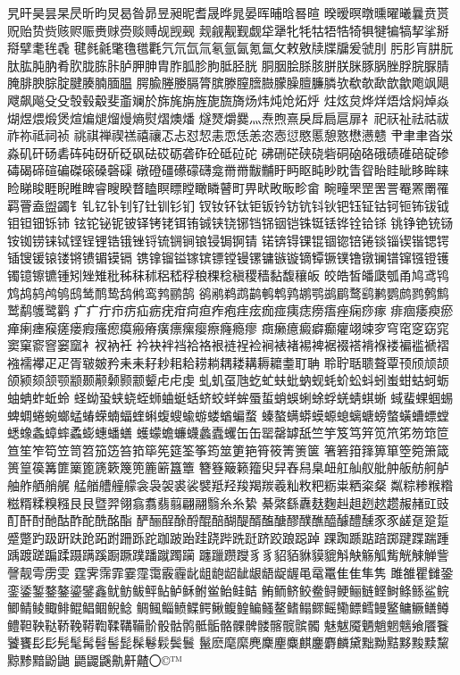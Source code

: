 旯旰昊昙杲昃昕昀炅曷昝昴昱昶昵耆晟晔晁晏晖晡晗晷暄
暌暧暝暾曛曜曦曩贲贳贶贻贽赀赅赆赈赉赇赍赕赙觇觊觋
觌觎觏觐觑牮犟牝牦牯牾牿犄犋犍犏犒挈挲掰搿擘耄毪毳
毽毵毹氅氇氆氍氕氘氙氚氡氩氤氪氲攵敕敫牍牒牖爰虢刖
肟肜肓肼朊肽肱肫肭肴肷胧胨胩胪胛胂胄胙胍胗朐胝胫胱
胴胭脍脎胲胼朕脒豚脶脞脬脘脲腈腌腓腴腙腚腱腠腩腼腽
腭腧塍媵膈膂膑滕膣膪臌朦臊膻臁膦欤欷欹歃歆歙飑飒飓
飕飙飚⽎殳彀毂觳斐齑斓於旆旄旃旌旎旒旖炀炜炖炝炻烀
炷炫炱烨烊焐焓焖焯焱煳煜煨煅煲煊煸煺熘熳熵熨熠燠燔
燧燹爝爨灬焘煦熹戾戽扃扈扉礻祀祆祉祛祜祓祚祢祗祠祯
祧祺禅禊禚禧禳忑忐怼恝恚恧恁恙恣悫愆愍慝憩憝懋懑戆
肀⾀聿沓泶淼矶矸砀砉砗砘砑斫砭砜砝砹砺砻砟砼砥砬砣
砩硎硭硖硗砦硐硇硌硪碛碓碚碇碜碡碣碲碹碥磔磙磉磬磲
礅磴礓礤礞礴龛⿋黹黻黼盱眄眍盹眇眈眚眢眙眭眦眵眸睐
睑睇睃睚睨睢睥睿瞍睽瞀瞌瞑瞟瞠瞰瞵瞽町畀畎畋畈畛畲
畹疃罘罡罟詈罨罴罱罹羁罾盍盥蠲钅钆钇钋钊钌钍钏钐钔
钗钕钚钛钜钣钤钫钪钭钬钯钰钲钴钶钷钸钹钺钼钽钿铄铈
铉铊铋铌铍铎铐铑铒铕铖铗铙铘铛铞铟铠铢铤铥铧铨铪铩
铫铮铯铳铴铵铷铹铼铽铿锃锂锆锇锉锊锍锎锏锒锓锔锕锖
锘锛锝锞锟锢锪锫锩锬锱锲锴锶锷锸锼锾锿镂锵镄镅镆镉
镌镎镏镒镓镔镖镗镘镙镛镞镟镝镡镢镤镥镦镧镨镩镪镫镬
镯镱镲镳锺矧矬雉秕秭秣秫稆嵇稃稂稞稔稹稷穑黏馥穰皈
皎皓皙皤瓞瓠甬鸠鸢鸨鸩鸪鸫鸬鸲鸱鸶鸸鸷鸹鸺鸾鹁鹂鹄
鹆鹇鹈鹉鹋鹌鹎鹑鹕鹗鹚鹛鹜鹞鹣鹦鹧鹨鹩鹪鹫鹬鹱鹭鹳
⽧疒疔疖疠疝疬疣疳疴疸痄疱疰痃痂痖痍痣痨痦痤痫痧瘃
痱痼痿瘐瘀瘅瘌瘗瘊瘥瘘瘕瘙瘛瘼瘢瘠癀瘭瘰瘿瘵癃瘾瘳
癍癞癔癜癖癫癯翊竦穸穹窀窆窈窕窦窠窬窨窭窳衤衩衲衽
衿袂袢裆袷袼裉裢裎裣裥裱褚裼裨裾裰褡褙褓褛褊褴褫褶
襁襦襻⽦疋胥皲皴矜⽾耒耔耖耜耠耢耥耦耧耩耨耱耋耵聃
聆聍聒聩聱覃顸颀颃颉颌颍颏颔颚颛颞颟颡颢颥颦⾌虍虔
虬虮虿虺虼虻蚨蚍蚋蚬蚝蚧蚣蚪蚓蚩蚶蛄蚵蛎蚰蚺蚱蚯蛉
蛏蚴蛩蛱蛲蛭蛳蛐蜓蛞蛴蛟蛘蛑蜃蜇蛸蜈蜊蜍蜉蜣蜻蜞蜥
蜮蜚蜾蝈蜴蜱蜩蜷蜿螂蜢蝽蝾蝻蝠蝰蝌蝮螋蝓蝣蝼蝤蝙蝥
螓螯螨蟒蟆螈螅螭螗螃螫蟥螬螵螳蟋蟓螽蟑蟀蟊蟛蟪蟠蟮
蠖蠓蟾蠊蠛蠡蠹蠼⽸缶罂罄罅舐竺竽笈笃笄笕笊笫笏筇笸
笪笙笮笱笠笥笤笳笾笞筘筚筅筵筌筝筠筮筻筢筲筱箐箦箧
箸箬箝箨箅箪箜箢箫箴篑篁篌篝篚篥篦篪簌篾篼簏簖簋簟
簪簦簸籁籀臾舁舂舄臬衄舡舢舣舭舯舨舫舸舻舳舴舾艄艉
艋艏艚艟艨衾袅袈裘裟襞羝羟羧羯羰羲籼敉粑粝粜粞粢粲
粼粽糁糇糌糍糈糅糗糨⾉艮暨羿翎翕翥翡翦翩翮翳⽷糸絷
綦綮繇纛麸麴赳趄趔趑趱赧赭豇豉酊酐酎酏酤酢酡酰酩酯
酽酾酲酴酹醌醅醐醍醑醢醣醪醭醮醯醵醴醺⾗豕鹾趸跫踅
蹙蹩趵趿趼趺跄跖跗跚跞跎跏跛跆跬跷跸跣跹跻跤踉跽踔
踝踟踬踮踣踯踺蹀踹踵踽踱蹉蹁蹂蹑蹒蹊蹰蹶蹼蹯蹴躅躏
躔躐躜躞⾘豸貂貊貅貘貔斛觖觞觚觜觥觫觯訾謦靓雩雳雯
霆霁霈霏霎霪霭霰霾龀龃龅龆龇龈龉龊龌黾鼋鼍⾫隹隼隽
雎雒瞿雠銎銮鋈錾鍪鏊鎏鐾鑫鱿鲂鲅鲆鲇鲈稣鲋鲎鲐鲑鲒
鲔鲕鲚鲛鲞鲟鲠鲡鲢鲣鲥鲦鲧鲨鲩鲫鲭鲮鲰鲱鲲鲳鲴鲵鲶
鲷鲺鲻鲼鲽鳄鳅鳆鳇鳊鳋鳌鳍鳎鳏鳐鳓鳔鳕鳗鳘鳙鳜鳝鳟
鳢靼鞅鞑鞒鞔鞯鞫鞣鞲鞴骱骰骷鹘骶骺骼髁髀髅髂髋髌髑
魅魃魇魉魈魍魑飨餍餮饕饔⾽髟髡髦髯髫髻髭髹鬈鬏鬓鬟
鬣麽麾縻麂麇麈麋麒鏖麝麟黛黜黝黠黟黢黩黧黥黪黯鼢鼬
鼯鼹鼷鼽鼾齄〇©™

